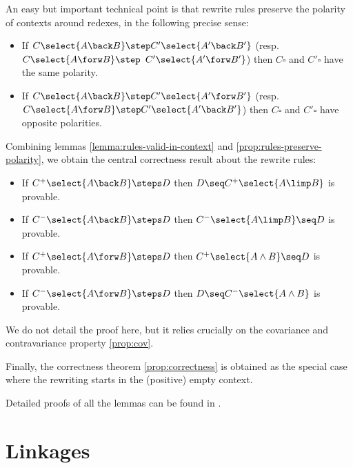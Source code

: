 An easy but important technical point is that rewrite rules preserve the
polarity of contexts around redexes, in the following precise sense:
\begin{lemma}\label{prop:rules-preserve-polarity}
  \phantom{a}
  \begin{itemize}
    \item
      If $C\select{A\back B} \step C'\select{A'\back B'}$
      (resp. $C\select{A \forw B} \step $ $ C' \allowbreak\select{A' \forw B'}$) then
      $C\square$ and $C'\square$ have the same polarity.
    \item
      If $C\select{A\back B} \step C'\select{A'\forw B'}$ (resp.
      $C\select{A\forw B} \step C'\select{A'\back B'}$) then $C\square$ and
      $C'\square$ have opposite polarities.
  \end{itemize}

\end{lemma}

Combining lemmas \ref{lemma:rules-valid-in-context} and
\ref{prop:rules-preserve-polarity}, we obtain the central correctness result
about the rewrite rules:
\begin{lemma}\label{lemma:rewriting-valid-in-context}
  \phantom{a}
  \begin{itemize}
    \item If $C^+\select{A\back B}\steps D$ then $D \seq C^+\select{A\limp B}$ is provable.
    \item If $C^-\select{A\back B} \steps D$ then $C^-\select{A\limp B}\seq D$ is provable.
    \item If $C^+\select{A \forw B} \steps D$ then $ C^+\select{A \land B}\seq D$ is provable.
    \item If $C^-\select{A \forw B} \steps D$ then $D \seq C^-\select{A \land B}$ is provable.
  \end{itemize}
\end{lemma}

We do not detail the proof here, but it relies crucially on the covariance and
contravariance property \ref{prop:cov}.

Finally, the correctness theorem \ref{prop:correctness} is obtained as the
special case where the rewriting starts in the (positive) empty context.

Detailed proofs of all the lemmas can be found in .

\section{Linkages}

